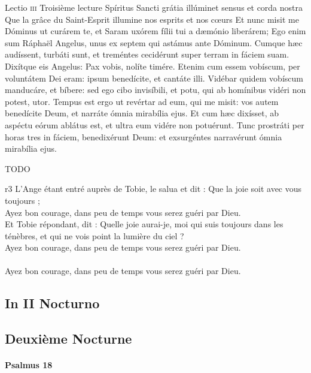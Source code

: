 \documentclass[twoside]{article}
\begin{document}
\begin{paracol}[1]{2}
\lectioresponsorium
	{Lectio \textsc{iii}}
	{Troisième lecture}
	{Spíritus Sancti grátia illúminet sensus et corda nostra}
	{Que la grâce du Saint-Esprit illumine nos esprits et nos cœurs}
	{
		Et nunc misit me Dóminus ut curárem te, et Saram uxórem fílii tui a dæmónio liberárem;
		Ego enim sum Ráphaël Angelus, unus ex septem qui astámus ante Dóminum.
		Cumque hæc audíssent, turbáti sunt, et treméntes cecidérunt super terram in fáciem suam.
		Dixítque eis Angelus: Pax vobis, nolíte timére.
		Etenim cum essem vobíscum, per voluntátem Dei eram: ipsum benedícite, et cantáte illi.
		Vidébar quidem vobíscum manducáre, et bíbere: sed ego cibo invisíbili, et potu, qui ab homínibus vidéri non potest, utor.
		Tempus est ergo ut revértar ad eum, qui me misit: vos autem benedícite Deum, et narráte ómnia mirabília ejus.
		Et cum hæc dixísset, ab aspéctu eórum ablátus est, et ultra eum vidére non potuérunt.
		Tunc prostráti per horas tres in fáciem, benedixérunt Deum: et exsurgéntes narravérunt ómnia mirabília ejus.
	}
	{	 TODO 
	
	}
	{r3}
	{\rr L’Ange étant entré auprès de Tobie, le salua et dit : Que la joie soit avec vous toujours ;\\
	\GreSpecial{*} Ayez bon courage, dans peu de temps vous serez guéri par Dieu.\\
	\vv Et Tobie répondant, dit : Quelle joie aurai-je, moi qui suis toujours dans les ténèbres, et qui ne vois point la lumière du ciel ?\\
	\GreSpecial{*} Ayez bon courage, dans peu de temps vous serez guéri par Dieu.\\
	\versetGloireAuPere{}\\
	\GreSpecial{*} Ayez bon courage, dans peu de temps vous serez guéri par Dieu.}

\subsection{In II Nocturno}

\switchcolumn

\subsection{Deuxième Nocturne}

\switchcolumn*

\paragraph{Psalmus 18}


\end{paracol}
\end{document}
